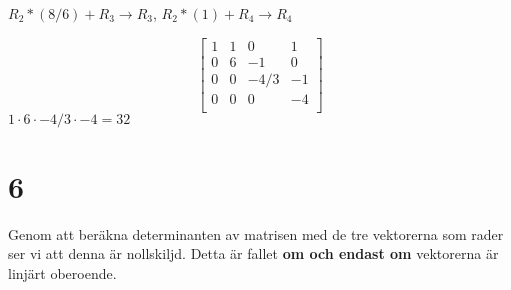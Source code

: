\documentclass{article}
\begin{document}
$R_2 * (8/6) + R_3 \rightarrow R_3$, \quad
$R_2 * (1) + R_4 \rightarrow R_4$   

$$
\begin{bmatrix}
    1  & 1   &  0   &  1 \\
    0  & 6   &  -1  &  0  \\
    0  & 0   &  -4/3   &  -1   \\
    0  & 0   &  0   &  -4   \\
\end{bmatrix}
$$
$1 \cdot 6 \cdot -4/3 \cdot -4 = 32$


\section*{6}
Genom att beräkna determinanten av matrisen med de tre vektorerna som rader 
ser vi att denna är nollskiljd. Detta är fallet {\bf om och endast om} 
vektorerna är linjärt oberoende.
\end{document}
